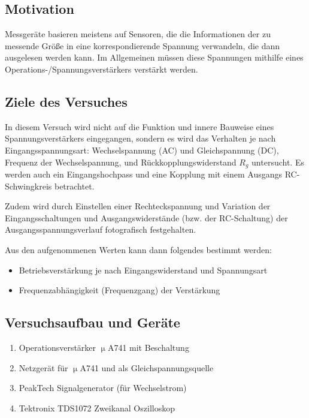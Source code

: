 \subsection{Motivation}
Messgeräte basieren meistens auf Sensoren, die die Informationen der zu messende Größe in eine korrespondierende Spannung verwandeln, die dann ausgelesen werden kann. Im Allgemeinen müssen diese Spannungen mithilfe eines Operations-/Spannungsverstärkers verstärkt werden.  

\subsection{Ziele des Versuches}
In diesem Versuch wird nicht auf die Funktion und innere Bauweise eines Spannungsverstärkers eingegangen, sondern es wird das Verhalten je nach Eingangsspannungsart: Wechselspannung (AC) und Gleichspannung (DC), Frequenz der Wechselspannung, und Rückkopplungswiderstand \(R_g\) untersucht. Es werden auch ein Eingangshochpass und eine Kopplung mit einem Ausgangs RC-Schwingkreis betrachtet.

Zudem wird durch Einstellen einer Rechteckspannung und Variation der Eingangsschaltungen und Ausgangswiderstände (bzw. der RC-Schaltung) der Ausgangsspannungsverlauf fotografisch festgehalten. 

Aus den aufgenommenen Werten kann dann folgendes bestimmt werden:
\begin{itemize}
    \item Betriebsverstärkung je nach Eingangswiderstand und Spannungsart
    \item Frequenzabhängigkeit (Frequenzgang) der Verstärkung  
\end{itemize}

\subsection{Versuchsaufbau und Geräte}
\begin{enumerate}
    \item Operationsverstärker \(\upmu\)A741 mit Beschaltung
    \item Netzgerät für \(\upmu\)A741 und als Gleichspannungsquelle
    \item PeakTech Signalgenerator (für Wechselstrom)
    \item Tektronix TDS1072 Zweikanal Oszilloskop
\end{enumerate}


